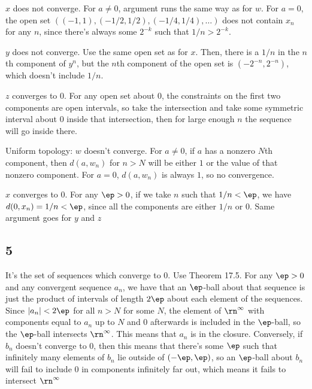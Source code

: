 \documentclass{article}
\begin{document}
$x$ does not converge. For $a\neq0$, argument runs the same way as for $w$. For $a=0$, the open set $((-1,1),(-1/2,1/2),(-1/4,1/4),\ldots)$ does not contain $x_n$ for any $n$, since there's always some $2^{-k}$ such that $1/n>2^{-k}$.

$y$ does not converge. Use the same open set as for $x$. Then, there is a $1/n$ in the $n$th component of $y^n$, but the $n$th component of the open set is $(-2^{-n},2^{-n})$, which doesn't include $1/n$.

$z$ converges to $0$. For any open set about $0$, the constraints on the first two components are open intervals, so take the intersection and take some symmetric interval about $0$ inside that intersection, then for large enough $n$ the sequence will go inside there.

Uniform topology: $w$ doesn't converge. For $a\neq0$, if $a$ has a nonzero $N$th component, then $d(a,w_n)$ for $n>N$ will be either $1$ or the value of that nonzero component. For $a=0$, $d(a,w_n)$ is always $1$, so no convergence.

$x$ converges to $0$. For any $\ep>0$, if we take $n$ such that $1/n<\ep$, we have $d(0,x_n)=1/n<\ep$, since all the components are either $1/n$ or $0$. Same argument goes for $y$ and $z$
\subsection*{5}
It's the set of sequences which converge to $0$. Use Theorem 17.5. For any $\ep>0$ and any convergent sequence $a_n$, we have that an $\ep$-ball about that sequence is just the product of intervals of length $2\ep$ about each element of the sequences. Since $|a_n|<2\ep$ for all $n>N$ for some $N$, the element of $\rn^{\infty}$ with components equal to $a_n$ up to $N$ and $0$ afterwards is included in the $\ep$-ball, so the $\ep$-ball intersects $\rn^{\infty}$. This means that $a_n$ is in the closure. Conversely, if $b_n$ doesn't converge to $0$, then this means that there's some $\ep$ such that infinitely many elements of $b_n$ lie outside of $(-\ep,\ep)$, so an $\ep$-ball about $b_n$ will fail to include $0$ in components infinitely far out, which means it fails to intersect $\rn^{\infty}$
\end{document}
